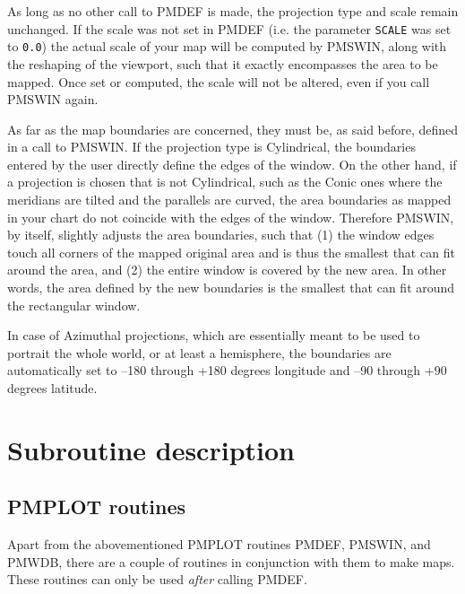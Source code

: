\documentclass[titlepage,a4paper]{article}
\begin{document}
As long as no other call to PMDEF is made, the projection type and scale remain
unchanged. If the scale was not set in PMDEF (i.e. the parameter \verb|SCALE| was set
to \verb|0.0|) the actual scale of your map will be computed by PMSWIN, along with
the reshaping of the viewport, such that it exactly encompasses the area to be
mapped. Once set or computed, the scale will not be altered, even if you call
PMSWIN again.

As far as the map boundaries are concerned, they must be, as said before,
defined
in a call to PMSWIN. If the projection type is Cylindrical, the boundaries
entered by the user directly define the edges of the window. On the other hand,
if a projection is chosen that is not Cylindrical, such as the Conic ones where
the meridians are tilted and the parallels are curved, the area boundaries as
mapped in your chart do not coincide with the edges of the window. Therefore
PMSWIN, by itself, slightly adjusts the area boundaries, such that (1) the
window edges touch all corners of the mapped original area and is thus the
smallest that can fit around the area, and (2) the entire window is covered by
the new area. In other words, the area defined by the new boundaries is the
smallest that can fit around the rectangular window.

In case of Azimuthal projections, which are essentially meant to be used to
portrait the whole world, or at least a hemisphere, the boundaries are
automatically set to --180 through +180 degrees longitude and --90 through +90
degrees latitude.

\section{Subroutine description}
\subsection{PMPLOT routines}
Apart from the abovementioned PMPLOT routines PMDEF, PMSWIN, and
PMWDB, there are a couple of routines in conjunction with them to make
maps. These routines can only be used {\em after} calling PMDEF.
\end{document}
